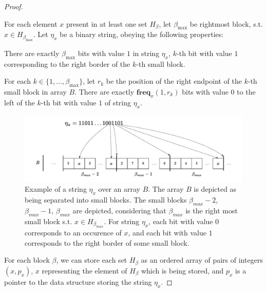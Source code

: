 \documentclass[runningheads]{llncs}
\begin{document}
\begin{proof}
    \begin{definition}
        For each element $x$ present in at least one set $H_{\beta}$, let $\beta_{\text{max}}$ be rightmost block, s.t. $x\in H_{\beta_{\text{max}}}$. 
        Let $\eta_x$ be a binary string, obeying the following properties:
        \begin{property}
            There are exactly $\beta_{\text{max}}$ bits with value $1$ in string $\eta_x$, $k$-th bit with value $1$ corresponding to the right border of the $k$-th small block.
        \end{property}

        \begin{property}
            For each $k\in\{1,\dots, \beta_{\text{max}}\}$, let $r_k$ be the position of the right endpoint of the $k$-th small block in array $B$. 
            There are exactly $\textbf{freq}_x(1,r_k)$ bits with value $0$ to the left of the $k$-th bit with value $1$ of string $\eta_x$.
        \end{property}
    \end{definition}


    \begin{figure}[H]
        \centering
        \hspace*{-1cm}      
        \includegraphics[scale=0.7]{figures/example_figure6.pdf}
        \caption{
            Example of a string $\eta_x$ over an array $B$. The array $B$ is depicted as being separated into small blocks. 
            The small blocks $\beta_{max}-2$, $\beta_{max}-1$, $\beta_{max}$ are depicted, considering that $\beta_{max}$ is the right most small block s.t. $x\in H_{\beta_{max}}$.
            For string $\eta_x$, each bit with value $0$ corresponds to an occurence of $x$, and each bit with value $1$ corresponds to the right border of some small block.
            }
        \label{fig:fig6}
    \end{figure}


    For each block $\beta$, we can store each set $H_{\beta}$ as an ordered array of pairs of integers $(x, p_x)$, $x$ representing the element of $H_{\beta}$ which is being stored, and $p_x$ is a pointer to the 
    data structure storing the string $\eta_x$.
    

\end{proof}
\end{document}
